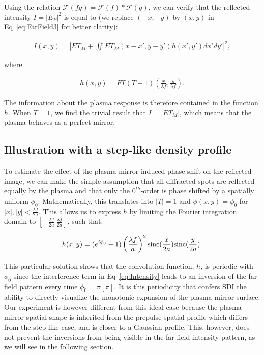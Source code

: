 \noindent Using the relation $\mathscr{F}(fg) = \mathscr{F}(f)*\mathscr{F}(g)$, we can verify that the reflected intensity $I = |E_{F}|^2$ is equal to (we replace $(-x,-y)$ by $(x,y)$ in Eq~\ref{eq:FarField3} for better clarity):

\begin{align} \label{eq:Intensity} I(x,y) = |ET_M + \iint ET_M(x-x',y-y')h(x',y')dx'dy'|^2, \end{align}

\noindent where

\begin{align} h(x,y) = FT(T-1)(\frac{x}{\lambda f},\frac{y}{\lambda f}).\end{align}

\noindent The information about the plasma response is therefore contained in the function $h$. When $T=1$, we find the trivial result that $I = |ET_M|$, which means that the plasma behaves as a perfect mirror. 

\subsection{Illustration with a step-like density profile}


\noindent To estimate the effect of the plasma mirror-induced phase shift on the reflected image, we can make the simple assumption that all diffracted spots are reflected equally by the plasma and that only the $0^{th}$-order is phase shifted by a spatially uniform $\phi_0$. Mathematically, this translates into $|T| = 1$ and $\phi(x,y) = \phi_0$ for $|x|,|y| < \frac{\lambda f}{2a}$. This allows us to express $h$ by limiting the Fourier integration domain to $[-\frac{\lambda f}{2a} \  \frac{\lambda f}{2a}]$, such that:

\begin{align} h(x,y) = (e^{i\phi_0}-1)\left(\frac{\lambda f}{a}\right)^2{\rm sinc}(\frac{x}{2a}){\rm sinc}(\frac{y}{2 a}) \label{eq:f}.\end{align}

\noindent This particular solution shows that the convolution function, $h$, is periodic with $\phi_0$ since the interference term in Eq~\ref{eq:Intensity} leads to an inversion of the far-field pattern every time $\phi_0 = \pi [\pi]$. It is this periodicity that confers SDI the ability to directly visualize the monotonic expansion of the plasma mirror surface.\\

\noindent Our experiment is however different from this ideal case because the plasma mirror spatial shape is inherited from the prepulse spatial profile which differs from the step like case, and is closer to a Gaussian profile. This, however, does not prevent the inversions from being visible in the far-field intensity pattern, as we will see in the following section.




